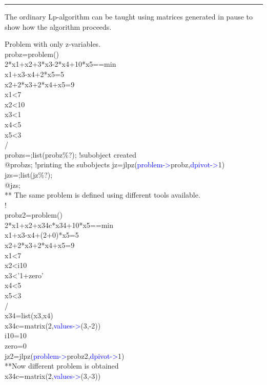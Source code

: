 \hrule
\vspace{0.2cm}
\begin{note}
The ordinary Lp-algorithm can be taught using matrices generated in pause to show how the algorithm proceeds.
\end{note}
\begin{example}[jlpzex]Problem with only z-variables.\\
\label{jlpzex}
probz=\textcolor{VioletRed}{problem}()\\
2*x1+x2+3*x3-2*x4+10*x5==min\\
x1+x3-x4+2*x5=5\\
x2+2*x3+2*x4+x5=9\\
x1<7\\
x2<10\\
x3<1\\
x4<5\\
x5<3\\
/\\
probzs=;list(probz\%?); !subobject created\\
@probzs; !printing the subobjects
jz=\textcolor{VioletRed}{jlpz}(\textcolor{blue}{problem->}probz,\textcolor{blue}{dpivot->}1)\\
jzs=;list(jz\%?);\\
@jzs;\\
** The same problem is defined using different tools available.\\
	!\\
probz2=\textcolor{VioletRed}{problem}()\\
2*x1+x2+x34c*x34+10*x5==min\\
x1+x3-x4+(2+0)*x5=5\\
x2+2*x3+2*x4+x5=9\\
x1<7\\
x2<i10\\
x3<'1+zero'\\
x4<5\\
x5<3\\
/\\
x34=\textcolor{VioletRed}{list}(x3,x4)\\
x34c=\textcolor{VioletRed}{matrix}(2,\textcolor{blue}{values->}(3,-2))\\
i10=10\\
zero=0\\
jz2=\textcolor{VioletRed}{jlpz}(\textcolor{blue}{problem->}probz2,\textcolor{blue}{dpivot->}1)\\
**Now different problem is obtained\\
x34c=\textcolor{VioletRed}{matrix}(2,\textcolor{blue}{values->}(3,-3))\\

\end{example}
